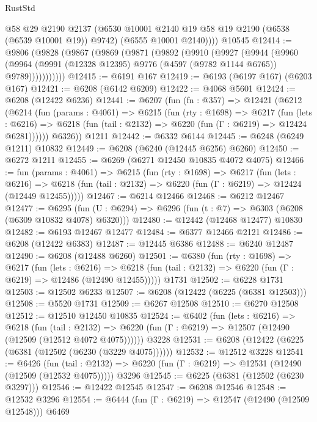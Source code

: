 \begin{lexlean}{RustStd}
\begin{coremodule}
          @58
          @29
          @2190
          @2137
          (@6530 @10001 @2140 @19 @58 @19 @2190 (@6538 (@6539 @10001 @19)) @9742)
          (@6555 @10001 @2140))))
    @10545
@12414 := @9806
    (@9828
      (@9867
        (@9869
          (@9871
            (@9892
              (@9910
                (@9927
                  (@9944
                    (@9960
                      (@9964
                        (@9991 (@12328 @12395) @9776 (@4597 (@9782 @1144 @6765)) @9789)))))))))))
@12415 := @6191 @167
@12419 := @6193 (@6197 @167) (@6203 @167)
@12421 := @6208 (@6142 @6209)
@12422 := @4068 @5601
@12424 := @6208 (@12422 @6236)
@12441 := @6207
    (fun (fn : @357) =>
    @12421
      (@6212
        (@6214
          (fun (params : @4061) =>
          @6215
            (fun (rty : @1698) =>
            @6217
              (fun (lets : @6216) =>
              @6218 (fun (tail : @2132) => @6220 (fun (Γ : @6219) => @12424 @6281))))))
        @6326))
    @1211
@12442 := @6332 @6144
@12445 := @6248 (@6249 @1211) @10832
@12449 := @6208 (@6240 (@12445 @6256) @6260)
@12450 := @6272 @1211
@12455 := @6269 (@6271 @12450 @10835 @4072 @4075)
@12466 := fun (params : @4061) =>
  @6215
    (fun (rty : @1698) =>
    @6217
      (fun (lets : @6216) =>
      @6218 (fun (tail : @2132) => @6220 (fun (Γ : @6219) => @12424 (@12449 @12455)))))
@12467 := @6214 @12466
@12468 := @6212 @12467
@12477 := @6295
    (fun (U : @6294) => @6296 (fun (t : @7) => @6303 (@6208 (@6309 @10832 @4078) @6320)))
@12480 := @12442 (@12468 @12477) @10830
@12482 := @6193 @12467 @12477
@12484 := @6377 @12466 @2121
@12486 := @6208 (@12422 @6383)
@12487 := @12445 @6386
@12488 := @6240 @12487
@12490 := @6208 (@12488 @6260)
@12501 := @6380
    (fun (rty : @1698) =>
    @6217
      (fun (lets : @6216) =>
      @6218 (fun (tail : @2132) => @6220 (fun (Γ : @6219) => @12486 (@12490 @12455)))))
    @1731
@12502 := @6228 @1731
@12503 := @12502 @6233
@12507 := @6208 (@12422 (@6225 (@6381 @12503)))
@12508 := @5520 @1731
@12509 := @6267 @12508
@12510 := @6270 @12508
@12512 := @12510 @12450 @10835
@12524 := @6402
    (fun (lets : @6216) =>
    @6218
      (fun (tail : @2132) =>
      @6220 (fun (Γ : @6219) => @12507 (@12490 (@12509 (@12512 @4072 @4075))))))
    @3228
@12531 := @6208 (@12422 (@6225 (@6381 (@12502 (@6230 (@3229 @4075))))))
@12532 := @12512 @3228
@12541 := @6426
    (fun (tail : @2132) => @6220 (fun (Γ : @6219) => @12531 (@12490 (@12509 (@12532 @4075)))))
    @3296
@12545 := @6225 (@6381 (@12502 (@6230 @3297)))
@12546 := @12422 @12545
@12547 := @6208 @12546
@12548 := @12532 @3296
@12554 := @6444 (fun (Γ : @6219) => @12547 (@12490 (@12509 @12548))) @6469

\end{coremodule}
\end{lexlean}
